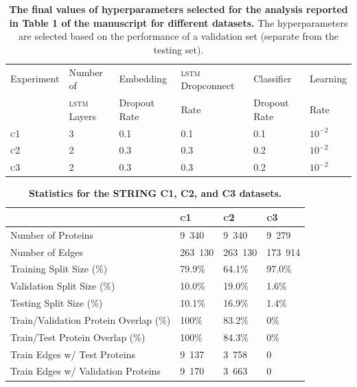 \begin{table}[h]
	\caption[The final values of hyperparameters selected.]{\textbf{\textsf{The final values of hyperparameters selected for the analysis reported in Table 1 of the manuscript for different datasets.}} The hyperparameters are selected based on the performance of a validation set (separate from the testing set). \label{tab:rapppid_hyperparams}} {
    \begin{tabular}{@{}llllll@{}}\toprule 
			Experiment & Number of & Embedding & \textsc{lstm} Dropconnect & Classifier & Learning\\
            & \textsc{lstm} Layers & Dropout Rate & Rate & Dropout Rate & Rate\\\midrule
            \textsc{c1} & 3 & 0.1 & 0.1 & 0.1 & $10^{-2}$\\
            \textsc{c2} & 2 & 0.3 & 0.3 & 0.2 & $10^{-2}$\\
            \textsc{c3} & 2 & 0.3 & 0.3 & 0.2 & $10^{-2}$\\
			\midrule
	\end{tabular}
    }{}
\end{table}

\begin{table}[h]
	\caption[Statistics for the \textsc{string} \textsc{c1}, \textsc{c2}, and \textsc{c3} datasets.]{\textbf{\textsf{Statistics for the STRING C1, C2, and C3 datasets.}} \label{tab:rapppid_data_stats}} {
    \begin{center}
    \begin{tabular}{@{}llll@{}}\toprule 
            & \textsc{c1} & \textsc{c2} & \textsc{c3} \\\midrule
            Number of Proteins & 9~340 & 9~340 & 9~279 \\
            Number of Edges & 263~130 & 263~130 & 173~914 \\
            Training Split Size (\%) & 79.9\% & 64.1\% & 97.0\% \\
            Validation Split Size (\%) & 10.0\% & 19.0\% & 1.6\% \\
            Testing Split Size (\%) & 10.1\% & 16.9\% & 1.4\% \\
            Train/Validation Protein Overlap (\%) & 100\% & 83.2\% & 0\% \\
            Train/Test Protein Overlap (\%) & 100\% & 84.3\% & 0\% \\
            Train Edges w/ Test Proteins & 9~137 & 3~758 & 0 \\
            Train Edges w/ Validation Proteins & 9~170 & 3~663 & 0 \\
			\midrule
	\end{tabular}
    \end{center}
    }{}
\end{table}

